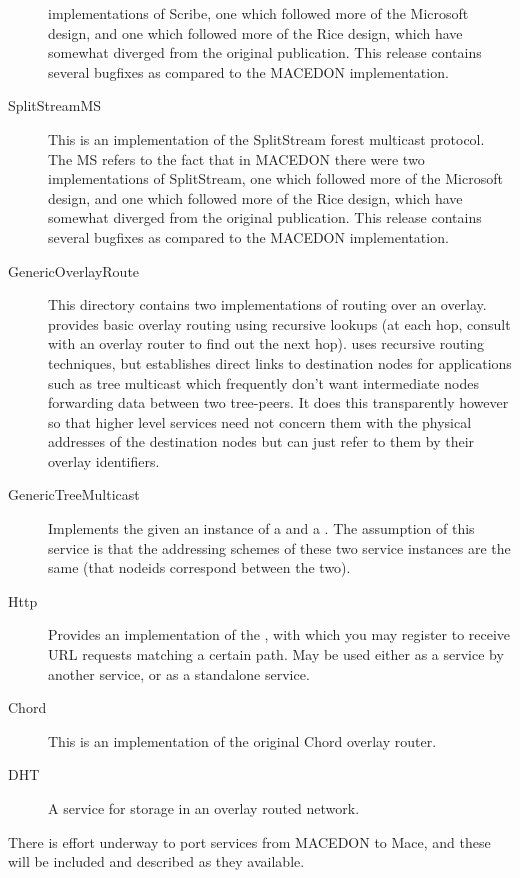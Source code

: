 \begin{description}
  implementations of Scribe, one which followed more of the Microsoft design,
  and one which followed more of the Rice design, which have somewhat diverged
  from the original publication.  This release contains several bugfixes as
  compared to the MACEDON implementation.
\item[SplitStreamMS] This is an implementation of the SplitStream forest 
  multicast protocol.  The MS refers to the fact that in MACEDON there were
  two implementations of SplitStream, one which followed more of the Microsoft
  design, and one which followed more of the Rice design, which have somewhat
  diverged from the original publication.  This release contains several bugfixes
  as compared to the MACEDON implementation.
\item[GenericOverlayRoute] This directory contains two implementations of routing over an overlay.
   provides basic overlay routing using
  recursive lookups (at each hop, consult with an overlay router to find out
  the next hop).   uses recursive routing
  techniques, but establishes direct links to destination nodes for
  applications such as tree multicast which frequently don't want intermediate
  nodes forwarding data between two tree-peers.  It does this transparently
  however so that higher level services need not concern them with the physical
  addresses of the destination nodes but can just refer to them by their overlay
  identifiers.
\item[GenericTreeMulticast] Implements the 
  given an instance of a  and a .
  The assumption of this service is that the addressing schemes of these two service
  instances are the same (that nodeids correspond between the two).
\item[Http] Provides an implementation of the ,
  with which you may register to receive URL requests matching a certain path.
  May be used either as a service by another service, or as a standalone service.
\item[Chord] This is an implementation of the original Chord overlay router.
\item[DHT] A service for storage in an overlay routed network.
\end{description}

There is effort underway to port services from MACEDON to Mace, and these 
will be included and described as they available.

